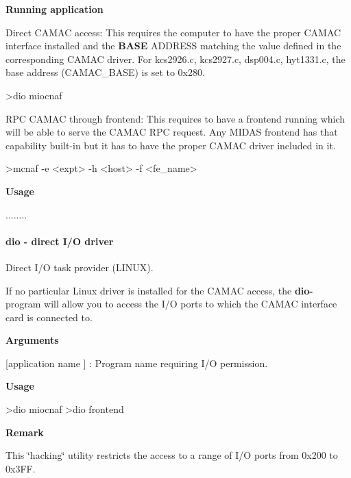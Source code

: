 \begin{DoxyItemize}
\item {\bfseries  Running application }
\begin{DoxyItemize}
\item Direct CAMAC access: This requires the computer to have the proper CAMAC interface installed and the {\bfseries BASE} ADDRESS matching the value defined in the corresponding CAMAC driver. For kcs2926.c, kcs2927.c, dsp004.c, hyt1331.c, the base address (CAMAC\_\-BASE) is set to 0x280. 
\begin{DoxyCode}
   >dio miocnaf
\end{DoxyCode}

\item RPC CAMAC through frontend: This requires to have a frontend running which will be able to serve the CAMAC RPC request. Any MIDAS frontend has that capability built-\/in but it has to have the proper CAMAC driver included in it. 
\begin{DoxyCode}
     >mcnaf -e <expt> -h <host> -f <fe_name>
\end{DoxyCode}

\end{DoxyItemize}
\end{DoxyItemize}


\begin{DoxyItemize}
\item {\bfseries  Usage } 
\begin{DoxyCode}
  ........
\end{DoxyCode}

\end{DoxyItemize}



 \hypertarget{FE_utils_FE_dio_utility}{}\paragraph{dio          -\/ direct I/O driver}\label{FE_utils_FE_dio_utility}
Direct I/O task provider (LINUX).

If no particular Linux driver is installed for the CAMAC access, the {\bfseries dio-\/} program will allow you to access the I/O ports to which the CAMAC interface card is connected to.


\begin{DoxyItemize}
\item {\bfseries  Arguments }
\begin{DoxyItemize}
\item \mbox{[}application name \mbox{]} : Program name requiring I/O permission.
\end{DoxyItemize}
\item {\bfseries  Usage } 
\begin{DoxyCode}
 >dio miocnaf
 >dio frontend 
\end{DoxyCode}

\item {\bfseries  Remark }
\item This \char`\"{}hacking\char`\"{} utility restricts the access to a range of I/O ports from 0x200 to 0x3FF.
\end{DoxyItemize}


